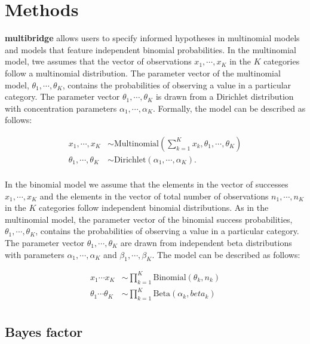 \documentclass[
  english,
  man,floatsintext]{apa6}
\begin{document}
\hypertarget{methods}{%
\section{Methods}\label{methods}}

\textbf{multibridge} allows users to specify informed hypotheses in multinomial models and models that feature independent binomial probabilities. In the multinomial model, twe assumes that the vector of observations \(x_1, \cdots, x_K\) in the \(K\) categories follow a multinomial distribution. The parameter vector of the multinomial model, \(\theta_1, \cdots, \theta_K\), contains the probabilities of observing a value in a particular category. The parameter vector \(\theta_1, \cdots, \theta_K\) is drawn from a Dirichlet distribution with concentration parameters \(\alpha_1, \cdots, \alpha_K\). Formally, the model can be described as follows:

\begin{align}
  x_1, \cdots, x_K &\sim \text{Multinomial}(\sum_{k = 1}^K x_k, \theta_1, \cdots, \theta_K) \\
  \theta_1, \cdots, \theta_K &\sim \text{Dirichlet}(\alpha_1, \cdots, \alpha_K). \\
\end{align}

In the binomial model we assume that the elements in the vector of successes \(x_1, \cdots, x_K\) and the elements in the vector of total number of observations \(n_1, \cdots, n_K\) in the \(K\) categories follow independent binomial distributions. As in the multinomial model, the parameter vector of the binomial success probabilities, \(\theta_1, \cdots, \theta_K\), contains the probabilities of observing a value in a particular category. The parameter vector \(\theta_1, \cdots, \theta_K\) are drawn from independent beta distributions with parameters \(\alpha_1, \cdots, \alpha_K\) and \(\beta_1, \cdots, \beta_K\). The model can be described as follows:

\begin{align}
  x_1 \cdots x_K & \sim \prod_{k = 1}^K \text{Binomial}(\theta_k, n_k) \\
  \theta_1 \cdots \theta_K &\sim \prod_{k = 1}^K \text{Beta}(\alpha_k, beta_k) \\
\end{align}

\hypertarget{bayes-factor}{%
\subsection{Bayes factor}\label{bayes-factor}}
\end{document}

